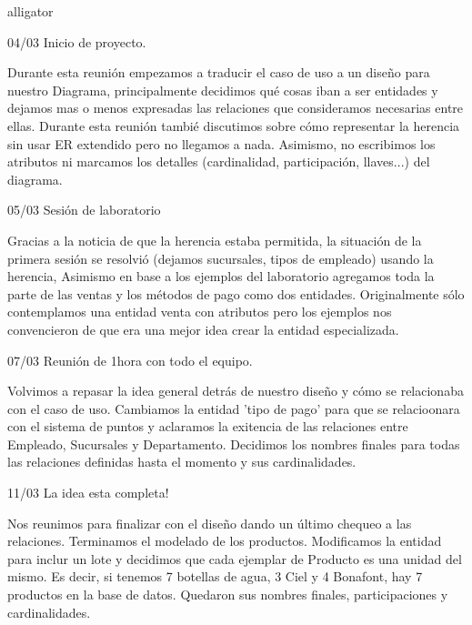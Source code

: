 \documentclass[10pt]{article}
\begin{document}
	\begin{labeling}{alligator}
		\item [04/03] Inicio de proyecto.
            
            Durante esta reunión empezamos a traducir el caso de uso a un diseño para
            nuestro Diagrama, principalmente decidimos qué cosas iban a ser entidades y
            dejamos mas o menos expresadas las relaciones que consideramos necesarias
            entre ellas. Durante esta reunión tambié discutimos sobre cómo representar la
            herencia sin usar ER extendido pero no llegamos a nada. Asimismo, no escribimos
            los atributos ni marcamos los detalles (cardinalidad, participación, llaves...) del
            diagrama.
            
		\item [05/03] Sesión de laboratorio
		
            Gracias a la noticia de que la herencia estaba permitida, la situación de la primera 
            sesión se resolvió (dejamos sucursales, tipos de empleado) usando la herencia,
            Asimismo en base a los ejemplos del laboratorio agregamos toda la parte de las
            ventas y los métodos de pago como dos entidades. Originalmente sólo
            contemplamos una entidad venta con atributos pero los ejemplos nos convencieron
            de que era una mejor idea crear la entidad especializada. 
    
		\item [07/03] Reunión de 1hora con todo el equipo.
		
            Volvimos a repasar la idea general detrás de nuestro diseño y cómo se relacionaba
            con el caso de uso. Cambiamos la entidad 'tipo de pago' para que se relacioonara
            con el sistema de puntos y aclaramos la exitencia de las relaciones entre
            Empleado, Sucursales y Departamento. Decidimos los nombres finales para todas
            las relaciones definidas hasta el momento y sus cardinalidades.
            
		\item [11/03] La idea esta completa!
            
            Nos reunimos para finalizar con el diseño dando un último chequeo a las relaciones.
            Terminamos el modelado de los productos. Modificamos la entidad para inclur un
            lote y decidimos que cada ejemplar de Producto es una unidad del mismo.
            Es decir, si tenemos 7 botellas de agua, 3 Ciel y 4 Bonafont, hay 7 productos en la
            base de datos. Quedaron sus nombres finales, participaciones y cardinalidades.
        

\end{labeling}
\end{document}
